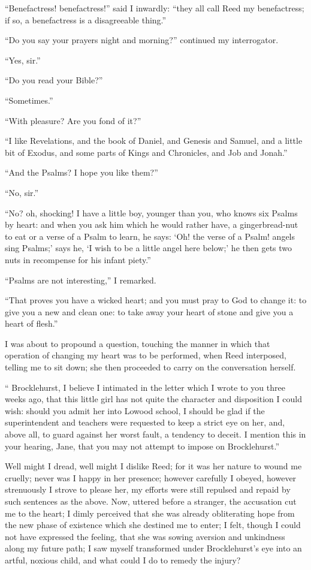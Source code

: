\enquote{Benefactress! benefactress!} said I inwardly: \enquote{they all
	call \Mrs{} Reed my benefactress; if so, a benefactress is a disagreeable
	thing.}

\enquote{Do you say your prayers night and morning?} continued my
interrogator.

\enquote{Yes, sir.}

\enquote{Do you read your Bible?}

\enquote{Sometimes.}

\enquote{With pleasure? Are you fond of it?}

\enquote{I like Revelations, and the book of Daniel, and Genesis and
	Samuel, and a little bit of Exodus, and some parts of Kings and
	Chronicles, and Job and Jonah.}

\enquote{And the Psalms? I hope you like them?}

\enquote{No, sir.}

\enquote{No? oh, shocking! I have a little boy, younger than you, who
	knows six Psalms by heart: and when you ask him which he would rather
	have, a gingerbread-nut to eat or a verse of a Psalm to learn, he says:
	\enquote{Oh! the verse of a Psalm! angels sing Psalms;} says he,
	\enquote{I wish to be a little angel here below;} he then gets two nuts
	in recompense for his infant piety.}

\enquote{Psalms are not interesting,} I remarked.

\enquote{That proves you have a wicked heart; and you must pray to God
	to change it: to give you a new and clean one: to take away your heart
	of stone and give you a heart of flesh.}

I was about to propound a question, touching the manner in which that
operation of changing my heart was to be performed, when \Mrs{} Reed
interposed, telling me to sit down; she then proceeded to carry on the
conversation herself.

\enquote{\Mr{} Brocklehurst, I believe I intimated in the letter which I
	wrote to you three weeks ago, that this little girl has not quite the
	character and disposition I could wish: should you admit her into Lowood
	school, I should be glad if the superintendent and teachers were
	requested to keep a strict eye on her, and, above all, to guard against
	her worst fault, a tendency to deceit. I mention this in your hearing,
	Jane, that you may not attempt to impose on \Mr{} Brocklehurst.}

Well might I dread, well might I dislike \Mrs{} Reed; for it was her
nature to wound me cruelly; never was I happy in her presence; however
carefully I obeyed, however strenuously I strove to please her, my
efforts were still repulsed and repaid by such sentences as the above.
Now, uttered before a stranger, the accusation cut me to the heart; I
dimly perceived that she was already obliterating hope from the new
phase of existence which she destined me to enter; I felt, though I
could not have expressed the feeling, that she was sowing aversion and
unkindness along my future path; I saw myself transformed under \Mr{}
Brocklehurst's eye into an artful, noxious child, and what could I do to
remedy the injury?

